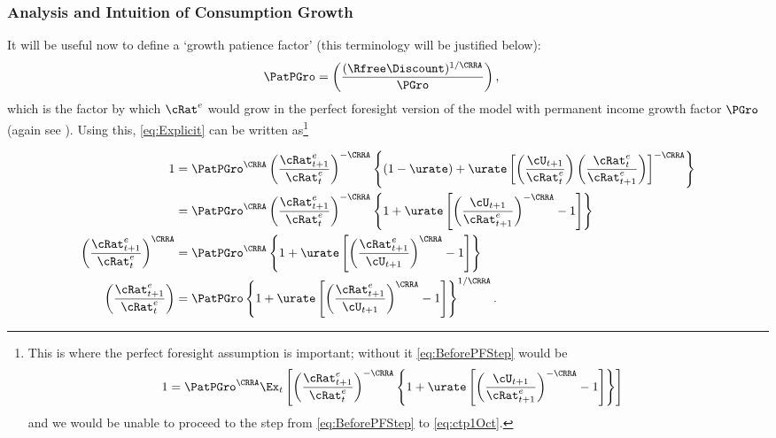 \documentclass{handout}
\begin{document}
\subsubsection{Analysis and Intuition of Consumption Growth}
It will be useful now to define a `growth patience factor' (this terminology will be justified below):
\begin{equation}\begin{gathered}\begin{aligned}
  \PatPGro & =  \left(\frac{(\Rfree\Discount)^{1/\CRRA}}{\PGro}\right), \label{eq:PatPGro}
\end{aligned}\end{gathered}\end{equation}
which is the factor by which ${\cRat}^{e}$ would grow in the
perfect foresight version of the model with permanent income growth factor
$\PGro$ (again see ).  
Using this,
\eqref{eq:Explicit} can be written as\footnote{This is where the perfect foresight assumption is important; without it \eqref{eq:BeforePFStep} would be 
\begin{equation}\begin{gathered}\begin{aligned}
 1       & =  \PatPGro^{\CRRA} \Ex_{t}\left[\left(\frac{{\cRat}^{e}_{t+1}}{{\cRat}^{e}_{t}}\right)^{-\CRRA} \left\{1+\urate\left[\left(\frac{\cU_{t+1}}{{\cRat}^{e}_{t+1}}\right)^{-\CRRA}-1\right]\right\}\right] \label{eq:BeforePFStepWithEx}
\end{aligned}\end{gathered}\end{equation}
and we would be unable to proceed to the step from \eqref{eq:BeforePFStep} to \eqref{eq:ctp1Oct}.}

\begin{equation}\begin{gathered}\begin{aligned}
        1  & = \PatPGro^{\CRRA} \left(\frac{{\cRat}^{e}_{t+1}}{{\cRat}^{e}_{t}}\right)^{-\CRRA} \left\{(1-\urate)+\urate\left[\left(\frac{\cU_{t+1}}{{\cRat}^{e}_{t}}\right)\left(\frac{{\cRat}^{e}_{t}}{{\cRat}^{e}_{t+1}}\right)\right]^{-\CRRA}\right\}
\\       & = \PatPGro^{\CRRA} \left(\frac{{\cRat}^{e}_{t+1}}{{\cRat}^{e}_{t}}\right)^{-\CRRA} \left\{1+\urate\left[\left(\frac{\cU_{t+1}}{{\cRat}^{e}_{t+1}}\right)^{-\CRRA}-1\right]\right\} \label{eq:BeforePFStep}
\\       \left(\frac{{\cRat}^{e}_{t+1}}{{\cRat}^{e}_{t}}\right)^{\CRRA} & = \PatPGro^{\CRRA} \left\{1+\urate\left[\left(\frac{{\cRat}^{e}_{t+1}}{\cU_{t+1}}\right)^{\CRRA}-1\right]\right\} \label{eq:ctp1Oct}
\\       \left(\frac{{\cRat}^{e}_{t+1}}{{\cRat}^{e}_{t}}\right) & = {\PatPGro} \left\{1+\urate\left[\left(\frac{{\cRat}^{e}_{t+1}}{\cU_{t+1}}\right)^{\CRRA}-1\right]\right\}^{1/\CRRA}. \label{eq:cedel}
\end{aligned}\end{gathered}\end{equation}
\end{document}
